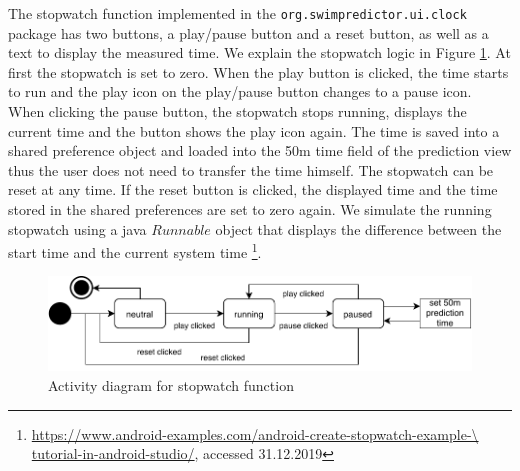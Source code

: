 The stopwatch function implemented in the \texttt{org.swimpredictor.ui.clock} package has two buttons, a play/pause button and a reset button, as well as a text to display the measured time. We explain the stopwatch logic in Figure \ref{fig:stopwatch_logic}. At first the stopwatch is set to zero. When the play button is clicked, the time starts to run and the play icon on the play/pause button changes to a pause icon. When clicking the pause button, the stopwatch stops running, displays the current time and the button shows the play icon again. The time is saved into a shared preference object and loaded into the 50m time field of the prediction view thus the user does not need to transfer the time himself. The stopwatch can be reset at any time. If the reset button is clicked, the displayed time and the time stored in the shared preferences are set to zero again. We simulate the running stopwatch using a java $Runnable$ object that displays the difference between the start time and the current system time \footnote{\url{https://www.android-examples.com/android-create-stopwatch-example-\ tutorial-in-android-studio/}, accessed 31.12.2019}.\\
\begin{figure}[ht]
    \centering
    \includegraphics[scale=0.5]{visualisation/StopwatchLogic.pdf}
    \caption{Activity diagram for stopwatch function}
    \label{fig:stopwatch_logic}
\end{figure}
